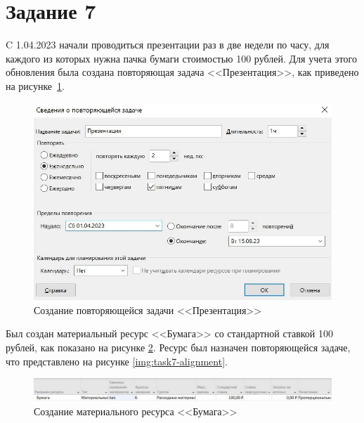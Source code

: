 \section*{Задание 7}

C 1.04.2023 начали проводиться презентации раз в две недели по часу, для каждого из которых нужна пачка бумаги стоимостью 100 рублей. Для учета этого обновления была создана повторяющая задача <<Презентация>>, как приведено на рисунке~\ref{img:task7}.

\begin{figure}[H]
	\begin{center}
		\includegraphics[scale=0.25]{inc/img/task7.jpg}
	\end{center}
	\captionsetup{justification=centering}
	\caption{Создание повторяющейся задачи <<Презентация>>}
	\label{img:task7}
\end{figure}

Был создан материальный ресурс <<Бумага>> со стандартной ставкой 100 рублей, как показано на рисунке \ref{img:task7-paper}. Ресурс был назначен повторяющейся задаче, что представлено на рисунке \ref{img:task7-alignment}.

\begin{figure}[H]
	\begin{center}
		\includegraphics[scale=0.25]{inc/img/task7-paper.jpg}
	\end{center}
	\captionsetup{justification=centering}
	\caption{Создание материального ресурса <<Бумага>>}
	\label{img:task7-paper}
\end{figure}

